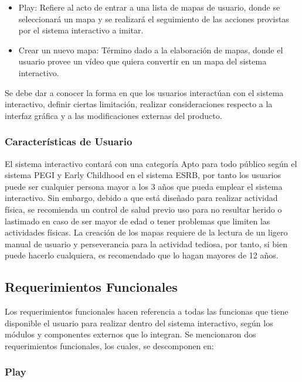 \begin{itemize}
	\item Play: Refiere al acto de entrar a una lista de mapas de usuario, donde se seleccionará un mapa y se realizará el seguimiento de las acciones provistas por el sistema interactivo a imitar.	
	\item Crear un nuevo mapa: Término dado a la elaboración de mapas, donde el usuario provee un vídeo que quiera convertir en un mapa del sistema interactivo.
\end{itemize}

Se debe dar a conocer la forma en que los usuarios interactúan con el sistema interactivo, definir ciertas limitación, realizar consideraciones respecto a la interfaz gráfica y a las modificaciones externas del producto.

\subsubsection{Características de Usuario}

El sistema interactivo contará con una categoría Apto para todo público según el sistema PEGI y Early Childhood en el sistema ESRB, por tanto los usuarios puede ser cualquier persona mayor a los 3 años que pueda emplear el sistema interactivo. Sin embargo, debido a que está diseñado para realizar actividad física, se recomienda un control de salud previo uso para no resultar herido o lastimado en caso de ser mayor de edad o tener problemas que limiten las actividades físicas.
La creación de los mapas requiere de la lectura de un ligero manual de usuario y perseverancia para la actividad tediosa, por tanto, si bien puede hacerlo cualquiera, es recomendado que lo hagan mayores de 12 años.


\subsection{Requerimientos Funcionales}

Los requerimientos funcionales hacen referencia a todas las funcionas que tiene disponible el usuario para realizar dentro del sistema interactivo, según los módulos y componentes externos que lo integran. Se mencionaron dos requerimientos funcionales, los cuales, se descomponen en:

\subsubsection{Play}

